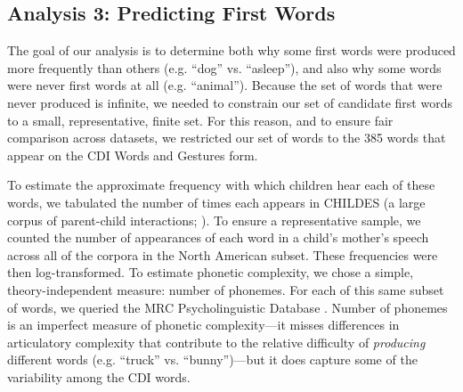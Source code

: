 \documentclass[10pt,letterpaper]{article}
\begin{document}
\subsection{Analysis 3: Predicting First Words}


The goal of our analysis is to determine both why some first words were produced more frequently than others (e.g. ``dog'' vs. ``asleep''), and also why some words were never first words at all (e.g. ``animal''). Because the set of words that were never produced is infinite, we needed to constrain our set of candidate first words to a small, representative, finite set. For this reason, and to ensure fair comparison across datasets, we restricted our set of words to the 385 words that appear on the CDI Words and Gestures form. 


To estimate the approximate frequency with which children hear each of these words, we tabulated the number of times each appears in CHILDES (a large corpus of parent-child interactions; ). To ensure a representative sample, we counted the number of appearances of each word in a child's mother's speech across all of the corpora in the North American subset. These frequencies were then log-transformed. To estimate phonetic complexity, we chose a simple, theory-independent measure: number of phonemes. For each of this same subset of words, we queried the MRC Psycholinguistic Database \cite{Wilson1988}. Number of phonemes is an imperfect measure of phonetic complexity---it misses differences in articulatory complexity that contribute to the relative difficulty of \emph{producing} different words (e.g. ``truck'' vs. ``bunny'')---but it does capture some of the variability among the CDI words.
\end{document}

